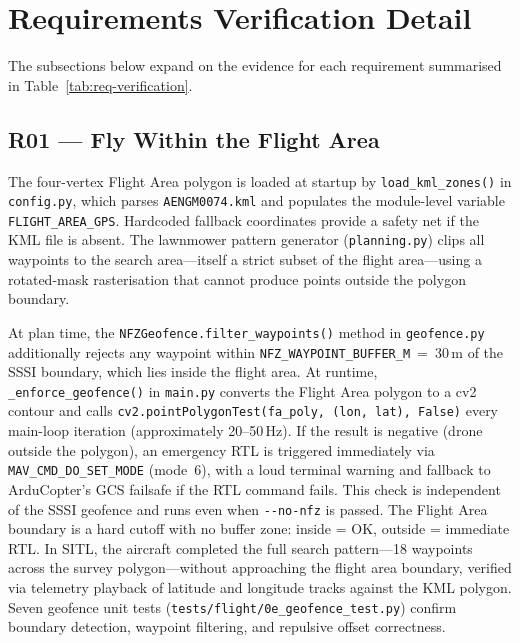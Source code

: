 
\section{Requirements Verification Detail}\label{app:req-detail}

The subsections below expand on the evidence for each requirement summarised in Table~\ref{tab:req-verification}.

\subsection{R01 --- Fly Within the Flight Area}

The four-vertex Flight Area polygon is loaded at startup by \texttt{load\_kml\_zones()} in \texttt{config.py}, which parses \texttt{AENGM0074.kml} and populates the module-level variable \texttt{FLIGHT\_AREA\_GPS}. Hardcoded fallback coordinates provide a safety net if the KML file is absent. The lawnmower pattern generator (\texttt{planning.py}) clips all waypoints to the search area---itself a strict subset of the flight area---using a rotated-mask rasterisation that cannot produce points outside the polygon boundary.

At plan time, the \texttt{NFZGeofence.filter\_waypoints()} method in \texttt{geofence.py} additionally rejects any waypoint within \texttt{NFZ\_WAYPOINT\_BUFFER\_M}~=~30\,m of the SSSI boundary, which lies inside the flight area. At runtime, \texttt{\_enforce\_geofence()} in \texttt{main.py} converts the Flight Area polygon to a cv2 contour and calls \texttt{cv2.pointPolygonTest(fa\_poly, (lon, lat), False)} every main-loop iteration (approximately 20--50\,Hz). If the result is negative (drone outside the polygon), an emergency RTL is triggered immediately via \texttt{MAV\_CMD\_DO\_SET\_MODE} (mode~6), with a loud terminal warning and fallback to ArduCopter's GCS failsafe if the RTL command fails. This check is independent of the SSSI geofence and runs even when \texttt{-{}-no-nfz} is passed. The Flight Area boundary is a hard cutoff with no buffer zone: inside = OK, outside = immediate RTL. In SITL, the aircraft completed the full search pattern---18 waypoints across the survey polygon---without approaching the flight area boundary, verified via telemetry playback of latitude and longitude tracks against the KML polygon. Seven geofence unit tests (\texttt{tests/flight/0e\_geofence\_test.py}) confirm boundary detection, waypoint filtering, and repulsive offset correctness.

